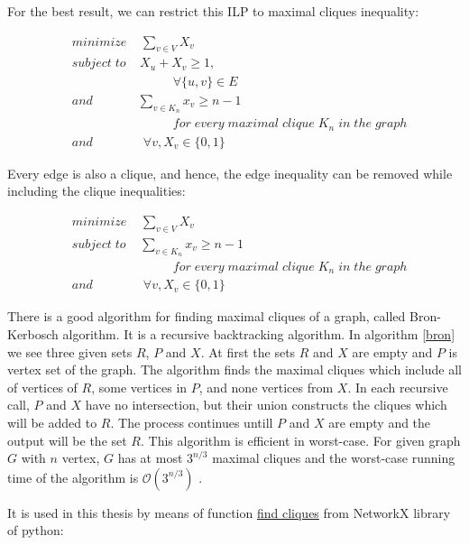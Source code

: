 \documentclass{beamer}
\begin{document}
{\begin{defi}
For the best result, we can restrict this ILP to maximal cliques inequality:


\begin{align*}
&minimize \; \;\; \; \sum_{v\in V}X_v\\
&subject\; to \;\;\; \; X_u + X_v  \geq 1 ,\\
&\qquad 	\qquad\qquad\qquad	 \forall \{u,v\} \in E\\
&and	\qquad\quad\;\; \sum_{v\in K_n}x_v \geq n - 1\\
& \qquad\qquad \qquad\qquad for\; every\; maximal\; clique\; K_n\; in\; the\; graph\\
&and	\qquad\qquad	 \forall v, X_v\in \{0,1\}
\end{align*}

Every edge is also a clique, and hence, the edge inequality can be removed
while including the clique inequalities:


\begin{align*}
&minimize \; \;\; \; \sum_{v\in V}X_v\\
&subject\; to \;\;\; \; \sum_{v\in K_n}x_v \geq n - 1\\
& \qquad\qquad \qquad\qquad for\; every\; maximal\; clique\; K_n\; in\; the\; graph\\
&and	\qquad\qquad	 \forall v, X_v\in \{0,1\}
\end{align*}

There is a good algorithm for finding maximal cliques of a graph, called Bron-Kerbosch\cite{bron} algorithm. It is a recursive  backtracking algorithm. In algorithm \ref{bron} we see three given sets $R$, $P$ and $X$. At first the sets $R$ and $X$ are empty and $P$ is vertex set of the graph. The algorithm finds the maximal cliques which include all of vertices of $R$, some vertices in $P$, and none vertices from $X$. In each recursive call, $P$ and $X$ have no intersection, but their union constructs the cliques which will be added to $R$. The process continues untill $P$ and $X$ are empty and the output will be the set $R$. This algorithm is efficient in worst-case. For given graph $G$ with $n$ vertex, $G$ has at most $3^{n/3}$ maximal cliques and the worst-case running time of the algorithm is $\mathcal{O}(3^{n/3})$ \cite{moon}. 


It is used in this thesis by means of function \href{https://networkx.github.io/documentation/networkx-1.10/reference/generated/networkx.algorithms.clique.find_cliques.html}{find cliques} from NetworkX library of python:

\vspace{1cm}


\end{defi}}
\end{document}
